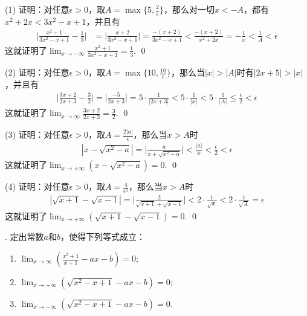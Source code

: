 \noindent (1) 证明：对任意$\epsilon > 0$，取$A = \max \{ 5, \displaystyle\frac{2}{\epsilon} \}$，那么对一切$x < -A$，都有$x^2+2x<3x^2-x+1$，并且有
\begin{align} 
    \bigg\lvert \displaystyle\frac{x^2+1}{3x^2-x+1} - \displaystyle\frac{1}{3} \bigg\rvert &= \bigg\lvert \displaystyle\frac{x+2}{3x^2-x+1} \bigg\rvert = \displaystyle\frac{-(x+2)}{3x^2-x+1} < \displaystyle\frac{-(x+2)}{x^2+2x} = -\displaystyle\frac{1}{x} < \frac{1}{A} < \epsilon
\end{align}
这就证明了$\displaystyle\lim_{x \to -\infty} \displaystyle\frac{x^2+1}{3x^2-x+1}=\displaystyle\frac{1}{3}$. \qed

\noindent (2) 证明：对任意$\epsilon > 0$，取$A = \max \{10, \displaystyle\frac{10}{\epsilon} \}$，那么当$|x| > |A|$时有$|2x+5|>|x|$，并且有
\begin{align}
    \bigg\lvert \displaystyle\frac{3x+2}{2x+3} - \displaystyle\frac{3}{2} \bigg\rvert = \bigg\lvert \displaystyle \frac{-5}{2x+3} \bigg\rvert = 5 \cdot \displaystyle\frac{1}{|2x+3|} < 5 \cdot \displaystyle\frac{1}{|x|} < 5 \cdot \displaystyle\frac{1}{|A|} \leq \displaystyle\frac{\epsilon}{2} < \epsilon
\end{align}
这就证明了$\displaystyle\lim_{x \to \infty} \displaystyle\frac{3x+2}{2x+3} = \displaystyle\frac{3}{2}$. \qed

\noindent (3) 证明：对任意$\epsilon > 0$，取$A = \displaystyle\frac{2|a|}{\epsilon}$，那么当$x > A$时
\begin{align}
    |x-\sqrt{x^2-a}|=\bigg\lvert \displaystyle\frac{a}{x+\sqrt{x^2-a}} \bigg\rvert < \displaystyle\frac{|a|}{x} < \displaystyle\frac{\epsilon}{2} < \epsilon
\end{align}
这就证明了$\displaystyle\lim_{x \to +\infty}(x-\sqrt{x^2-a})=0$. \qed

\noindent (4) 证明：对任意$\epsilon > 0$，取$A=\displaystyle\frac{4}{\epsilon^2}$，那么当$x > A$时
\begin{align}
    | \sqrt{x+1}-\sqrt{x-1} | = \bigg\lvert \displaystyle\frac{2}{\sqrt{x+1}+\sqrt{x-1}} \bigg\rvert < 2 \cdot \displaystyle\frac{1}{\sqrt{x}} < 2 \cdot \displaystyle\frac{1}{\sqrt{A}} = \epsilon
\end{align}
这就证明了$\displaystyle\lim_{x \to +\infty} (\sqrt{x+1}-\sqrt{x-1})=0$. \qed

. 定出常数$a$和$b$，使得下列等式成立：
\begin{enumerate}
    \item $\displaystyle\lim_{x\to\infty}\left(\displaystyle\frac{x^2+1}{x+1}-ax-b\right)=0$; 
    \item $\displaystyle\lim_{x\to +\infty}\left(\sqrt{x^2-x+1}-ax-b\right)=0$;
    \item $\displaystyle\lim_{x\to -\infty}\left(\sqrt{x^2-x+1}-ax-b\right)=0$.
\end{enumerate}

